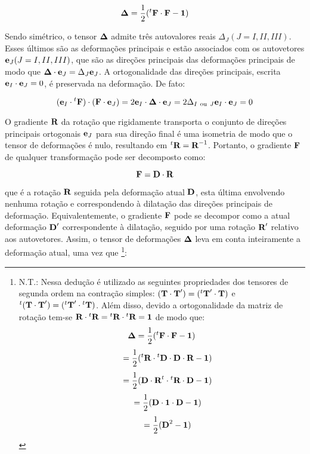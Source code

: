 \documentclass[
	11pt, %
	fleqn, %
	a4paper, %
]{LegrandOrangeBook}
\begin{document}
\begin{equation}
	\label{eq:Deltall}	
	\bm{\Delta} = \dfrac{1}{2}({}^t\textbf{F} \cdot \textbf{F} - \bm{1})
\end{equation}

Sendo simétrico, o tensor $\bm{\Delta}$ admite três autovalores reais $\Delta_J (J=I,II,III)$. Esses últimos são as deformações principais e estão associados com os autovetores $\textbf{e}_J (J=I,II,III)$, que são as direções principais das deformações principais de modo que $\bm{\Delta} \cdot \textbf{e}_J = \Delta_J \textbf{e}_J$. A ortogonalidade das direções principais, escrita $\textbf{e}_I \cdot \textbf{e}_J = 0$, é preservada na deformação. De fato:

\begin{equation}
	\label{eq:eIFFeJ}	
	(\textbf{e}_I \cdot {}^t \textbf{F}) \cdot (\textbf{F} \cdot \textbf{e}_J) = 2\textbf{e}_I \cdot \bm{\Delta} \cdot \textbf{e}_J = 2 \Delta_{I~\text{ou}~J} \textbf{e}_I \cdot \textbf{e}_J = 0
\end{equation}

O gradiente $\textbf{R}$ da rotação que rigidamente transporta o conjunto de direções principais ortogonais $\textbf{e}_J$ para sua direção final é uma isometria de modo que o tensor de deformações é nulo, resultando em ${}^t\textbf{R} = \textbf{R}^{-1}$. Portanto, o gradiente $\textbf{F}$ de qualquer transformação pode ser decomposto como:

\begin{equation}
	\label{eq:F=DR}	
	\textbf{F} = \textbf{D} \cdot \textbf{R}
\end{equation}

que é a rotação $\textbf{R}$ seguida pela deformação atual $\textbf{D}$, esta última envolvendo nenhuma rotação e correspondendo à dilatação das direções principais de deformação. Equivalentemente, o gradiente $\textbf{F}$ pode se decompor como a atual deformação $\textbf{D}'$ correspondente à dilatação, seguido por uma rotação $\textbf{R}'$ relativo aos autovetores. Assim, o tensor de deformações $\bm{\Delta}$ leva em conta inteiramente a deformação atual, uma vez que \footnote{
N.T.: Nessa dedução é utilizado as seguintes propriedades dos tensores de segunda ordem na contração simples: $(\textbf{T} \cdot \textbf{T}') = ({}^t\textbf{T}' \cdot \textbf{T})$ e ${}^t(\textbf{T} \cdot \textbf{T}') =({}^t\textbf{T}' \cdot {}^t\textbf{T})$. Além disso, devido a ortogonalidade da matriz de rotação tem-se $\textbf{R} \cdot {}^t\textbf{R} = {}^t\textbf{R} \cdot {}^t\textbf{R} = \bm{1}$ de modo que:
\begin{displaymath}	
	\bm{\Delta} = \dfrac{1}{2}({}^t\textbf{F} \cdot \textbf{F} - \bm{1})
\end{displaymath}
\begin{displaymath}	
	~~~~ = \dfrac{1}{2}({}^t\textbf{R} \cdot {}^t\textbf{D} \cdot \textbf{D} \cdot \textbf{R} - \bm{1})
\end{displaymath}
\begin{displaymath}	
	~~~~ = \dfrac{1}{2}(\textbf{D} \cdot \textbf{R}^t \cdot {}^t\textbf{R} \cdot \textbf{D} - \bm{1})
\end{displaymath}
\begin{displaymath}	
	~~~~ = \dfrac{1}{2}(\textbf{D} \cdot \bm{1} \cdot \textbf{D} - \bm{1})
\end{displaymath}
\begin{displaymath}	
	~~~~ = \dfrac{1}{2}(\textbf{D}^2- \bm{1})
\end{displaymath}

}:
\end{document}
